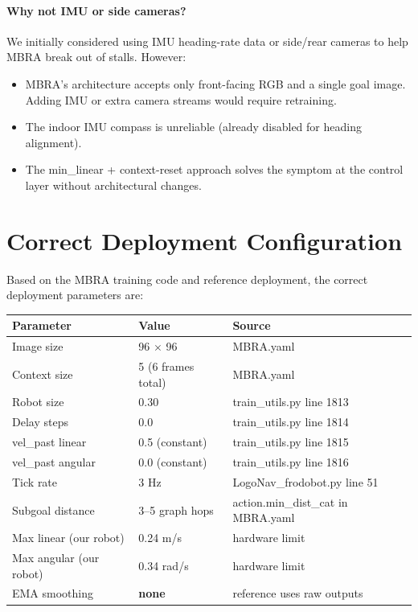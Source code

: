 \documentclass[11pt,a4paper]{article}
\begin{document}
\paragraph{Why not IMU or side cameras?}
We initially considered using IMU heading-rate data or side/rear cameras to
help MBRA break out of stalls.  However:
\begin{itemize}[nosep]
  \item MBRA's architecture accepts only front-facing RGB and a single goal
    image.  Adding IMU or extra camera streams would require retraining.
  \item The indoor IMU compass is unreliable (already disabled for heading
    alignment).
  \item The min\_linear + context-reset approach solves the symptom at the
    control layer without architectural changes.
\end{itemize}

\section{Correct Deployment Configuration}

Based on the MBRA training code and reference deployment, the correct
deployment parameters are:

\begin{center}
\begin{tabular}{lll}
\toprule
\textbf{Parameter} & \textbf{Value} & \textbf{Source} \\
\midrule
Image size & 96 $\times$ 96 & MBRA.yaml \\
Context size & 5 (6 frames total) & MBRA.yaml \\
Robot size & 0.30 & train\_utils.py line 1813 \\
Delay steps & 0.0 & train\_utils.py line 1814 \\
vel\_past linear & 0.5 (constant) & train\_utils.py line 1815 \\
vel\_past angular & 0.0 (constant) & train\_utils.py line 1816 \\
Tick rate & 3 Hz & LogoNav\_frodobot.py line 51 \\
Subgoal distance & 3--5 graph hops & action.min\_dist\_cat in MBRA.yaml \\
Max linear (our robot) & 0.24 m/s & hardware limit \\
Max angular (our robot) & 0.34 rad/s & hardware limit \\
EMA smoothing & \textbf{none} & reference uses raw outputs \\
\bottomrule
\end{tabular}
\end{center}
\end{document}
